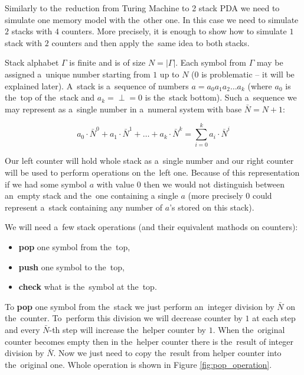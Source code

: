 \documentclass[english,shortabstract,mgr]{iithesis}
\begin{document}
Similarly to the~reduction from Turing Machine to 2 stack PDA we need to simulate
one memory model with the~other one. In this case we need to simulate $2$ stacks
with $4$ counters. More precisely, it is enough to show how to simulate $1$ stack
with $2$ counters and then apply the~same idea to both stacks.

Stack alphabet $\Gamma$ is finite and is of size $N = |\Gamma|$. Each symbol from $\Gamma$ may
be assigned a~unique number starting from $1$ up to $N$ ($0$ is problematic -- it will be
explained later). A~stack is a~sequence of numbers $a = a_0 a_1 a_2 \dots a_{k}$ (where $a_0$
is the~top of the~stack and $a_k = \perp = 0$ is the~stack bottom). Such a~sequence we may
represent as a~single number in a~numeral system with base $\bar{N} = N+1$:

$$ a_0 \cdot \bar{N}^0 + a_1 \cdot \bar{N}^1 + \dots + a_{k} \cdot \bar{N}^{k}
    = \sum_{i=0}^{k} a_i \cdot \bar{N}^i $$

Our left counter will hold whole stack as a~single number and our right counter will be used
to perform operations on the~left one. Because of this representation if we had some symbol $a$
with value $0$ then we would not distinguish between an~empty stack and the~one containing
a single $a$ (more precisely $0$ could represent a~stack containing any number of $a$'s
stored on this stack).

We will need a~few stack operations (and their equivalent
mathods on counters):
\begin{itemize}
  \item \textbf{pop} one symbol from the~top,
  \item \textbf{push} one symbol to the~top,
  \item \textbf{check} what is the~symbol at the~top.
\end{itemize}

To \textbf{pop} one symbol from the~stack we just perform an~integer division by $\bar{N}$ on
the~counter. To~perform this division we will decrease counter by $1$ at each step and every
$\bar{N}$-th step will increase the~helper counter by $1$. When the~original counter becomes empty
then in the~helper counter there is the~result of integer division by $\bar{N}$. Now we just
need to copy the~result from helper counter into the~original one. Whole operation is shown in
Figure \ref{fig:pop_operation}.
\end{document}
